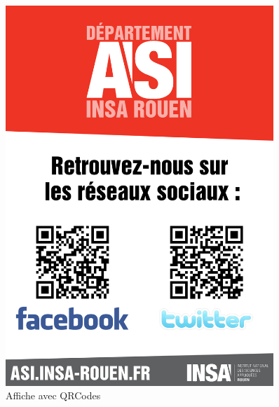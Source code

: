 		\begin{figure}
			\begin{center}
				\includegraphics[width=0.9\textwidth]{images/affiche.jpg}
				\caption{Affiche avec QRCodes}
			\end{center}
		\end{figure}
